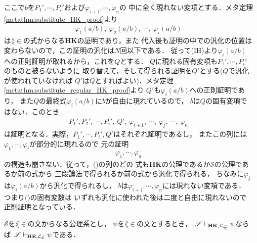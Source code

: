 \begin{metaprf}
\begin{description}
				ここで$b$を$P_{1}',\cdots,P_{i}'$および$\varphi_{i+1},\cdots,\varphi_{n}$の
				中に全く現れない変項とする．メタ定理\ref{metathm:substitute_HK_proof}より
				\begin{align}
					\varphi_{1}(a/b),\ \varphi_{2}(a/b),\ \cdots,\ \varphi_{i}(a/b)
				\end{align}
				は$\lang{\in}$の式からなる{\bf HK}の証明であり，また
				代入後も証明の中での汎化の位置は変わらないので，この証明の汎化は$N$回以下である．
				従って(IH)より$\varphi_{i}(a/b)$への正則証明が取れるから，これを$Q$とする．
				$Q$に現れる固有変項も$P_{1}',\cdots,P_{i}'$のものと被らないように
				取り替えて，そして得られる証明を$Q'$とする($Q$で汎化が使われていなければ
				$Q'$は$Q$とすればよい)．メタ定理\ref{metathm:substitute_regular_HK_proof}より
				$Q'$も$\varphi_{i}(a/b)$への正則証明であり，
				また$Q$の最終式$\varphi_{i}(a/b)$に$b$が自由に現れているので，
				$b$は$Q$の固有変項ではない．このとき
				\begin{align}
					P_{1}',P_{2}',\ \cdots,P_{i}',\ Q',\ \varphi_{i+1},\ 
					\cdots,\ \varphi_{j},\ \cdots,\ \varphi_{n}
					\label{seq:regularization_of_HK_proof_1}
				\end{align}
				は証明となる．実際，$P_{1}',\cdots,P_{i}',Q'$はそれぞれ証明であるし，
				またこの列には$\varphi_{1},\cdots,\varphi_{i}$が部分的に現れるので
				元の証明
				\begin{align}
					\varphi_{1},\cdots,\varphi_{n}
				\end{align}
				の構造も崩さない．従って，()の列のどの
				式も{\bf HK}の公理であるか$\mathscr{S}$の公理であるか前の式から
				三段論法で得られるか前の式から汎化で得られる，
				ちなみに$\varphi_{j}$は$\varphi_{i}(a/b)$から汎化で得られるし，
				$b$は$\varphi_{i+1},\cdots,\varphi_{n}$には現れない変項である．
				つまり()の固有変数は
				いずれも汎化に使われた後は二度と自由に現れないので正則証明となっている．
				\QED
		\end{description}
	\end{metaprf}
	
	\begin{screen}
		\begin{metathm}
		\label{metathm:theorems_in_HK_provable_in_HE}
			$\mathscr{S}$を$\lang{\in}$の文からなる公理系とし，
			$\psi$を$\lang{\in}$の文とするとき，
			$\mathscr{S} \provable{\mbox{{\bf HK}},\lang{\in}} \psi$ならば
			$\mathscr{S} \provable{\mbox{{\bf HE}},\lang{\varepsilon}} \psi$である．
		\end{metathm}
	\end{screen}
	

